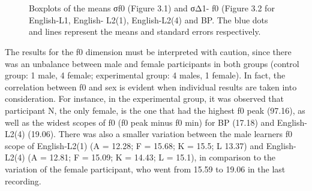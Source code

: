 \begin{figure}
\centering
{}\\
\\
\caption{Boxplots of the means σf0 (Figure 3.1) and σΔ1- f0 (Figure 3.2 for
English-L1, English- L2(1), English-L2(4) and BP. The blue dots and lines
represent the means and standard errors respectively.}
\label{leo-fig03}
\end{figure}

The results for the f0 dimension must be interpreted with caution, since there
was an unbalance between male and female participants in both groups (control
group: 1 male, 4 female; experimental group: 4 males, 1 female). In fact, the
correlation between f0 and sex is evident when individual results are taken
into consideration. For instance, in the experimental group, it was observed
that participant N, the only female, is the one that had the highest f0 peak
(97.16), as well as the widest scopes of f0 (f0 peak minus f0 min) for BP
(17.18) and English-L2(4) (19.06). There was also a smaller variation between
the male learners f0 scope of English-L2(1) (A = 12.28; F = 15.68; K = 15.5; L
13.37) and English-L2(4) (A = 12.81; F = 15.09; K = 14.43; L = 15.1), in
comparison to the variation of the female participant, who went from 15.59 to
19.06 in the last recording. 

